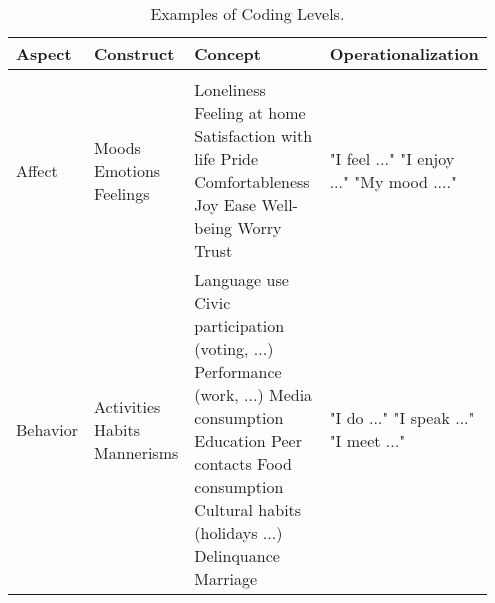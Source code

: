 \begin{table}%
\caption{Examples of Coding Levels. }
\label{tab:AspectExamples} 
\begin{tabular}{>{\raggedright\arraybackslash}p{0.15\linewidth} 
>{\raggedright\arraybackslash}p{0.20\linewidth} 
>{\raggedright\arraybackslash}p{0.35\linewidth} 
>{\raggedright\arraybackslash}p{0.25\linewidth}}
\hline 
Aspect & Construct & Concept & Operationalization \\ 
\hline \\ [-0.5em]
Affect & 
Moods \linebreak Emotions \linebreak Feelings \linebreak & 
Loneliness \linebreak Feeling at home \linebreak Satisfaction with life \linebreak Pride \linebreak Comfortableness \linebreak Joy \linebreak Ease \linebreak Well-being \linebreak Worry \linebreak Trust \linebreak & 
"I feel ..." \linebreak "I enjoy ..." \linebreak "My mood ...." \linebreak\\

Behavior & 
Activities \linebreak Habits \linebreak Mannerisms \linebreak & 
Language use \linebreak Civic participation (voting, ...) \linebreak Performance (work, ...) \linebreak Media consumption \linebreak Education \linebreak Peer contacts \linebreak Food consumption \linebreak Cultural habits (holidays ...) \linebreak Delinquance \linebreak Marriage \linebreak & 
"I do ..." \linebreak "I speak ..." \linebreak "I meet ..." \linebreak \\ 


\end{tabular}
\end{table}
